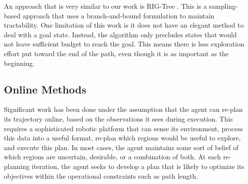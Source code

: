 An approach that is very similar to our work is RIG-Tree \cite{Hollinger2014Sampling-basedAlgorithms}. This is a sampling-based approach that uses a branch-and-bound formulation to maintain tractability. One limitation of this work is it does not have an elegant method to deal with a goal state. Instead, the algorithm only precludes states that would not leave sufficient budget to reach the goal. This means there is less exploration effort put toward the end of the path, even though it is as important as the beginning.


\subsection{Online Methods}
Significant work has been done under the assumption that the agent can re-plan its trajectory online, based on the observations it sees during execution. This requires a sophisticated robotic platform that can sense its environment, process this data into a useful format, re-plan which regions would be useful to explore, and execute this plan. In most cases, the agent maintains some sort of belief of which regions are uncertain, desirable, or a combination of both. At each re-planning iteration, the agent seeks to develop a plan that is likely to optimize its objectives within the operational constraints such as path length.

